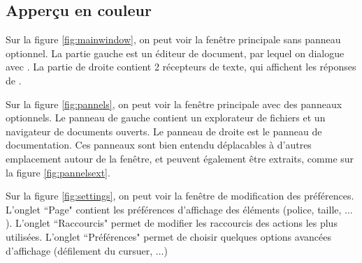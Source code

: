     \subsection{Apperçu en couleur}
    
        Sur la figure \ref{fig:mainwindow}, on peut voir la fenêtre principale sans panneau optionnel.
        La partie gauche est un éditeur de document, par lequel on dialogue avec \coq.
        La partie de droite contient 2 récepteurs de texte, qui affichent les réponses de \coq.
        
        Sur la figure \ref{fig:pannels}, on peut voir la fenêtre principale avec des panneaux optionnels.
        Le panneau de gauche contient un explorateur de fichiers et un navigateur de documents ouverts.
        Le panneau de droite est le panneau de documentation.
        Ces panneaux sont bien entendu déplacables à d'autres emplacement autour de la fenêtre, et peuvent également être extraits, comme sur la figure \ref{fig:pannelsext}.
        
        Sur la figure \ref{fig:settings}, on peut voir la fenêtre de modification des préférences.
        L'onglet ``Page" contient les préférences d'affichage des éléments (police, taille, $\ldots$).
        L'onglet ``Raccourcis" permet de modifier les raccourcis des actions les plus utilisées.
        L'onglet ``Préférences" permet de choisir quelques options avancées d'affichage (défilement du cursuer, $\ldots$)

